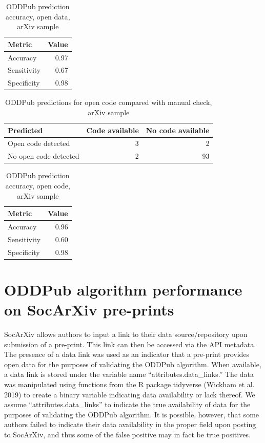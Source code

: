 \documentclass[
]{article}
\begin{document}
\begin{table}

\caption{\label{tab:arxiv-accuracy-data-2019}ODDPub prediction accuracy, open data, arXiv sample}
\centering
\begin{tabular}[t]{l|r}
\hline
Metric & Value\\
\hline
Accuracy & 0.97\\
\hline
Sensitivity & 0.67\\
\hline
Specificity & 0.98\\
\hline
\end{tabular}
\end{table}

\begin{table}

\caption{\label{tab:arxiv-confusion-code-2019}ODDPub predictions for open code compared with manual check, arXiv sample}
\centering
\begin{tabular}[t]{l|r|r}
\hline
Predicted & Code available & No code available\\
\hline
Open code detected & 3 & 2\\
\hline
No open code detected & 2 & 93\\
\hline
\end{tabular}
\end{table}

\begin{table}

\caption{\label{tab:arxiv-accuracy-code-2019}ODDPub prediction accuracy, open code, arXiv sample}
\centering
\begin{tabular}[t]{l|r}
\hline
Metric & Value\\
\hline
Accuracy & 0.96\\
\hline
Sensitivity & 0.60\\
\hline
Specificity & 0.98\\
\hline
\end{tabular}
\end{table}

\hypertarget{oddpub-algorithm-performance-on-socarxiv-pre-prints}{%
\section{ODDPub algorithm performance on SocArXiv pre-prints}\label{oddpub-algorithm-performance-on-socarxiv-pre-prints}}

SocArXiv allows authors to input a link to their data source/repository upon submission of a pre-print. This link can then be accessed via the API metadata. The presence of a data link was used as an indicator that a pre-print provides open data for the purposes of validating the ODDPub algorithm. When available, a data link is stored under the variable name ``attributes.data\_links.'' The data was manipulated using functions from the R package tidyverse (Wickham et al. 2019) to create a binary variable indicating data availability or lack thereof. We assume ``attributes.data\_links'' to indicate the true availability of data for the purposes of validating the ODDPub algorithm. It is possible, however, that some authors failed to indicate their data availability in the proper field upon posting to SocArXiv, and thus some of the false positive may in fact be true positives.
\end{document}

